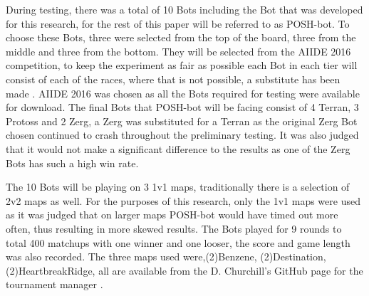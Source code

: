 \documentclass[journal]{IEEEtran}
\begin{document}
	During testing, there was a total of 10 Bots including the Bot that was developed for this research, for the rest of this paper will be referred to as POSH-bot. To choose these Bots, three were selected from the top of the board, three from the middle and three from the bottom. They will be selected from the AIIDE 2016 competition, to keep the experiment as fair as possible each Bot in each tier will consist of each of the races, where that is not possible, a substitute has been made \cite{2016}. AIIDE 2016 was chosen as all the Bots required for testing were available for download. The final Bots that POSH-bot will be facing consist of 4 Terran, 3 Protoss and 2 Zerg, a Zerg was substituted for a Terran as the original Zerg Bot chosen continued to crash throughout the preliminary testing. It was also judged that it would not make a significant difference to the results as one of the Zerg Bots has such a high win rate.
	
	The 10 Bots will be playing on 3 1v1 maps, traditionally there is a selection of 2v2 maps as well. For the purposes of this research, only the 1v1 maps were used as it was judged that on larger maps POSH-bot would have timed out more often, thus resulting in more skewed results. The Bots played for 9 rounds to total 400 matchups with one winner and one looser, the score and game length was also recorded. The three maps used were,(2)Benzene, (2)Destination, (2)HeartbreakRidge, all are available from the D. Churchill's GitHub page for the tournament manager \cite{Tournament}. 
	
\end{document}
